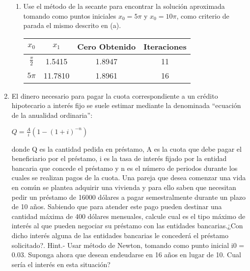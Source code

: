 \documentclass{udpreport}
\begin{document}
\begin{enumerate}
\begin{enumerate}
        \item Use el método de la secante para encontrar la solución aproximada tomando como puntos iniciales $x_{0}=5\pi$ y $x_{0}=10\pi$, como criterio de parada el mismo descrito en (a).
        	\begin{table} [H] 
        			\centering
        			\begin{tabular}{|c|c|c|c|}
        				\hline
        				$x_{0}$& $x_{1}$ & Cero Obtenido & Iteraciones\\
        				\hline
        				$\frac{\pi}{2}$ & 1.5415 & 1.8947 & 11 \\
        				\hline 
        				$5\pi$& 11.7810 & 1.8961     &16\\
        				\hline
        			\end{tabular}
        		\end{table}
        		
        		
        
       
        
    \end{enumerate}
		

\item El dinero necesario para pagar la cuota correspondiente a un crédito hipotecario a interés fijo se suele
estimar mediante la denominada “ecuación de la anualidad ordinaria”:
\begin{center}
    $ Q = \frac{A}{i}(1-(1+i)^{-n}) $
\end{center}
donde Q es la cantidad pedida en préstamo, A es la cuota que debe pagar el beneficiario por el
préstamo, i es la tasa de interés fijado por la entidad bancaria que concede el préstamo y n es el
número de periodos durante los cuales se realizan pagos de la cuota.
Una pareja que desea comenzar una vida en común se plantea adquirir una vivienda y para ello saben
que necesitan pedir un préstamo de 16000 dólares a pagar semestralmente durante un plazo de 10 años.
Sabiendo que para atender este pago pueden destinar una cantidad máxima de 400 dólares mensuales,
calcule cual es el tipo máximo de interés al que pueden negociar su préstamo con las entidades bancarias.¿Con dicho interés alguna de las entidades bancarias le concederá el préstamo solicitado?.
Hint.- Usar método de Newton, tomando como punto inicial i0 = 0.03.
Suponga ahora que desean endeudarse en 16 años en lugar de 10. Cual sería el interés en esta situación?



\end{enumerate}
\end{document}

